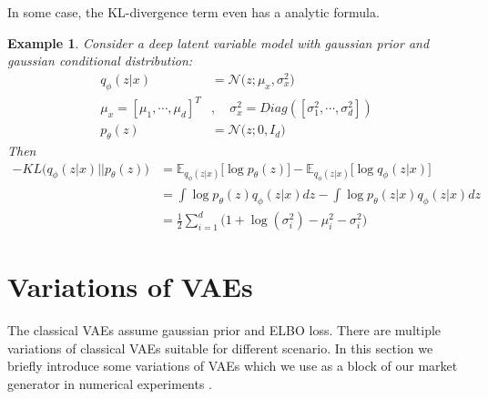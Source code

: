 \documentclass[12pt]{report}
\newtheorem{example}[theorem]{Example}
\theoremstyle{definition}
\theoremstyle{remark}
\newcommand{\E}{\mathbb{E}}
\begin{document}
In some case, the KL-divergence term even has a analytic formula.
\begin{example}
  Consider a deep latent variable model with gaussian prior and gaussian conditional distribution:
  \begin{equation}
    \begin{split}
      q_{\phi}(z|x) &= \mathcal{N}\Big(z;\mu_{x},\sigma_{x}^{2}\Big)\\
      \mu_{x} = [\mu_{1},\cdots,\mu_{d}]^{T} &,\quad \sigma^{2}_{x} = Diag([\sigma^{2}_{1},\cdots,\sigma^{2}_{d}])\\
      p_{\theta}(z) &= \mathcal{N}\Big(z;0,I_{d}\Big)
    \end{split}
  \end{equation}
  Then 
  \begin{equation}
    \begin{split}
       -KL\big(q_{\phi}(z|x) \big|\big| p_{\theta}(z)\big) &= \E_{q_{\phi}(z|x)}\big[\log p_{\theta}(z)\big] - \E_{q_{\phi}(z|x)}\big[\log q_{\phi}(z|x)\big]\\
       &= \int \log p_{\theta}(z) q_{\phi}(z|x) dz - \int \log p_{\theta}(z|x) q_{\phi}(z|x) dz\\
       &= \frac{1}{2}\sum_{i=1}^{d}\Big(1 + \log(\sigma_{i}^{2}) - \mu_{i}^{2} - \sigma_{i}^{2}\Big)
    \end{split}
  \end{equation}
\end{example}

\section{Variations of VAEs}
The classical VAEs assume gaussian prior and ELBO loss. There are multiple variations of classical VAEs suitable for different scenario. In this section we briefly introduce some variations of VAEs which we use as a block of our market generator in numerical experiments .
\end{document}
